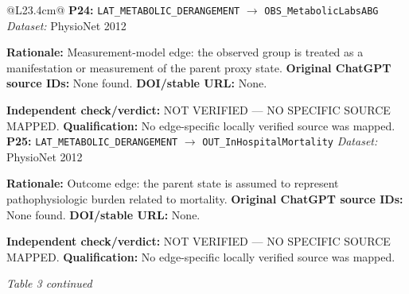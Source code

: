 \begin{tabular}{@{}L{23.4cm}@{}}
\addlinespace[2pt]
\midrule
\textbf{P24:} \nolinkurl{LAT_METABOLIC_DERANGEMENT} $\rightarrow$ \nolinkurl{OBS_MetabolicLabsABG} \hfill \textit{Dataset:} PhysioNet 2012\par\textbf{Rationale:} Measurement-model edge: the observed group is treated as a manifestation or measurement of the parent proxy state. \textbf{Original ChatGPT source IDs:} None found. \textbf{DOI/stable URL:} None.\par\textbf{Independent check/verdict:} NOT VERIFIED --- NO SPECIFIC SOURCE MAPPED. \textbf{Qualification:} No edge-specific locally verified source was mapped. \\
\addlinespace[2pt]
\midrule
\textbf{P25:} \nolinkurl{LAT_METABOLIC_DERANGEMENT} $\rightarrow$ \nolinkurl{OUT_InHospitalMortality} \hfill \textit{Dataset:} PhysioNet 2012\par\textbf{Rationale:} Outcome edge: the parent state is assumed to represent pathophysiologic burden related to mortality. \textbf{Original ChatGPT source IDs:} None found. \textbf{DOI/stable URL:} None.\par\textbf{Independent check/verdict:} NOT VERIFIED --- NO SPECIFIC SOURCE MAPPED. \textbf{Qualification:} No edge-specific locally verified source was mapped. \\
\addlinespace[2pt]
\midrule
\bottomrule
\end{tabular}
\clearpage
\textit{Table 3 continued}\par

